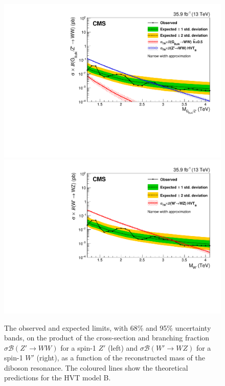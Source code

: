 \begin{figure}[!htb]
  \centering
    \includegraphics[width=.495\textwidth]{figures/B2G-17-001/CMS-B2G-17-001_Figure_006-a.pdf}%
    \includegraphics[width=.495\textwidth]{figures/B2G-17-001/CMS-B2G-17-001_Figure_006-b.pdf}
  \caption{The observed and expected limits, with 68\% and 95\% uncertainty bands, on the product of the cross-section and branching fraction $\sigma \mathcal{B} (Z' \rightarrow WW)$ for a spin-1 $Z'$ (left) and $\sigma \mathcal{B} (W' \rightarrow WZ)$ for a spin-1 $W'$ (right), as a function of the reconstructed mass of the diboson resonance. The coloured lines show the theoretical predictions for the HVT model B.~\cite{Sirunyan:2017acf,bib:CMS-PAS-B2G-17-001}}
  \label{fig:theory_B2G-17-001}
\end{figure}

